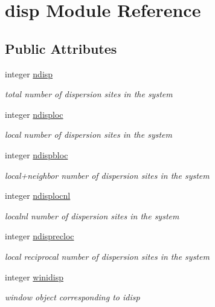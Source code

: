 \hypertarget{classdisp}{\section{disp Module Reference}
\label{classdisp}
}
\subsection*{Public Attributes}
\begin{DoxyCompactItemize}
\item 
integer \hyperlink{classdisp_a8bb0c7e5f4a883db33504183c37029c2}{ndisp}
\begin{DoxyCompactList}\small\item\em total number of dispersion sites in the system \end{DoxyCompactList}\item 
integer \hyperlink{classdisp_aba0f5019751df13bd9365c07af9072ff}{ndisploc}
\begin{DoxyCompactList}\small\item\em local number of dispersion sites in the system \end{DoxyCompactList}\item 
integer \hyperlink{classdisp_a2db13494e3d4f5d8b8868a4ad7f36cca}{ndispbloc}
\begin{DoxyCompactList}\small\item\em local+neighbor number of dispersion sites in the system \end{DoxyCompactList}\item 
integer \hyperlink{classdisp_a84ad104bb3cd00368e6dce2c46a6443b}{ndisplocnl}
\begin{DoxyCompactList}\small\item\em localnl number of dispersion sites in the system \end{DoxyCompactList}\item 
integer \hyperlink{classdisp_a5db554a09f47094dd69a4ff7b4bc2061}{ndisprecloc}
\begin{DoxyCompactList}\small\item\em local reciprocal number of dispersion sites in the system \end{DoxyCompactList}\item 
integer \hyperlink{classdisp_a3645c6bd2911d105ae4dd5712b9b44dc}{winidisp}
\begin{DoxyCompactList}\small\item\em window object corresponding to idisp \end{DoxyCompactList}\item 

\end{DoxyCompactItemize}
